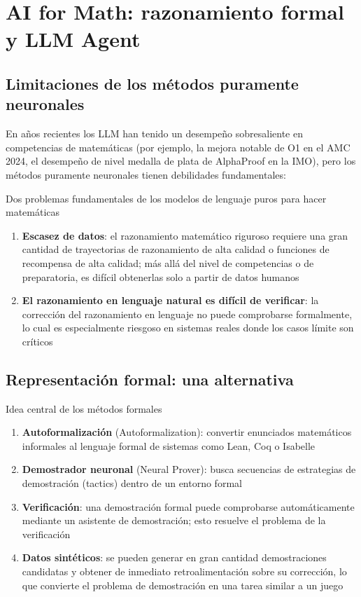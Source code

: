 \section{AI for Math: razonamiento formal y LLM Agent}

\subsection{Limitaciones de los métodos puramente neuronales}

En años recientes los LLM han tenido un desempeño sobresaliente en competencias de matemáticas (por ejemplo, la mejora notable de O1 en el AMC 2024, el desempeño de nivel medalla de plata de AlphaProof en la IMO), pero los métodos puramente neuronales tienen debilidades fundamentales:

\begin{warningbox}{Dos problemas fundamentales de los modelos de lenguaje puros para hacer matemáticas}
\begin{enumerate}
    \item \textbf{Escasez de datos}: el razonamiento matemático riguroso requiere una gran cantidad de trayectorias de razonamiento de alta calidad o funciones de recompensa de alta calidad; más allá del nivel de competencias o de preparatoria, es difícil obtenerlas solo a partir de datos humanos
    \item \textbf{El razonamiento en lenguaje natural es difícil de verificar}: la corrección del razonamiento en lenguaje no puede comprobarse formalmente, lo cual es especialmente riesgoso en sistemas reales donde los casos límite son críticos
\end{enumerate}
\end{warningbox}

\subsection{Representación formal: una alternativa}

\begin{importantbox}{Idea central de los métodos formales}
\begin{enumerate}
    \item \textbf{Autoformalización} (Autoformalization): convertir enunciados matemáticos informales al lenguaje formal de sistemas como Lean, Coq o Isabelle
    \item \textbf{Demostrador neuronal} (Neural Prover): busca secuencias de estrategias de demostración (tactics) dentro de un entorno formal
    \item \textbf{Verificación}: una demostración formal puede comprobarse automáticamente mediante un asistente de demostración; esto resuelve el problema de la verificación
    \item \textbf{Datos sintéticos}: se pueden generar en gran cantidad demostraciones candidatas y obtener de inmediato retroalimentación sobre su corrección, lo que convierte el problema de demostración en una tarea similar a un juego
\end{enumerate}
\end{importantbox}

